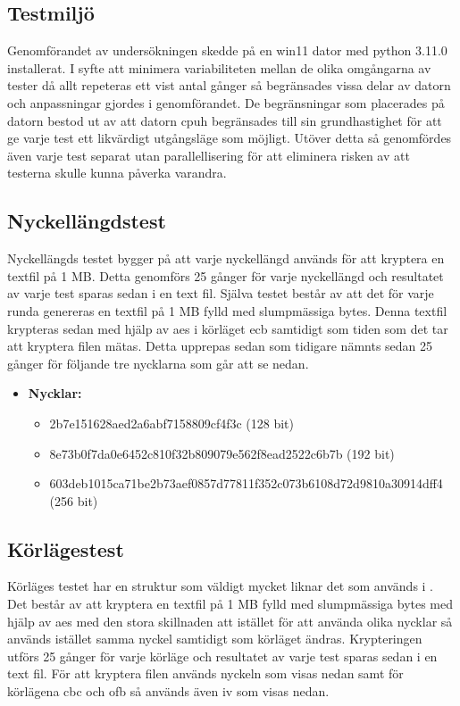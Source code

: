 \subsection{Testmiljö} %
Genomförandet av undersökningen skedde på en \gls{win11} dator med \gls{python} 3.11.0 installerat. I syfte att minimera variabiliteten
mellan de olika omgångarna av tester då allt repeteras ett vist antal gånger så begränsades vissa delar av datorn och anpassningar gjordes i genomförandet.
De begränsningar som placerades på datorn bestod ut av att datorn \gls{cpuh} begränsades till sin grundhastighet för att ge
varje test ett likvärdigt utgångsläge som möjligt. Utöver detta så genomfördes även varje test separat utan parallellisering för att
eliminera risken av att testerna skulle kunna påverka varandra.

\subsection{Nyckellängdstest} %
\label{sec:nyckellangd-test}
Nyckellängds testet bygger på att varje nyckellängd används för att kryptera en textfil på 1 MB. Detta genomförs 25 gånger för
varje nyckellängd och resultatet av varje test sparas sedan i en text fil. Själva testet består av att det för varje runda
genereras en textfil på 1 MB fylld med slumpmässiga \gls{byte}s. Denna textfil krypteras sedan med hjälp av \acrshort{aes} i körläget \acrshort{ecb} samtidigt
som tiden som det tar att kryptera filen mätas. Detta upprepas sedan som tidigare nämnts sedan 25 gånger för följande tre nycklarna som går att se nedan.

\begin{itemize}
    \item []\textbf{Nycklar:}
    \begin{itemize}
        \item 2b7e151628aed2a6abf7158809cf4f3c (128 bit)
        \item 8e73b0f7da0e6452c810f32b809079e562f8ead2522c6b7b (192 bit)
        \item 603deb1015ca71be2b73aef0857d77811f352c073b6108d72d9810a30914dff4 (256 bit)
    \end{itemize}
\end{itemize}

\subsection{Körlägestest} %
\label{sec:körlages-test}
Körläges testet har en struktur som väldigt mycket liknar det som används i . Det
består av att kryptera en textfil på 1 MB fylld med slumpmässiga bytes med hjälp av \acrshort{aes} med den stora skillnaden att istället för att använda olika nycklar så används
istället samma nyckel samtidigt som körläget ändras. Krypteringen utförs 25 gånger för varje körläge och resultatet av varje test sparas sedan i en text fil.
För att kryptera filen används nyckeln som visas nedan samt för körlägena \acrshort{cbc} och \acrshort{ofb} så används även \acrshort{iv} som visas nedan.

